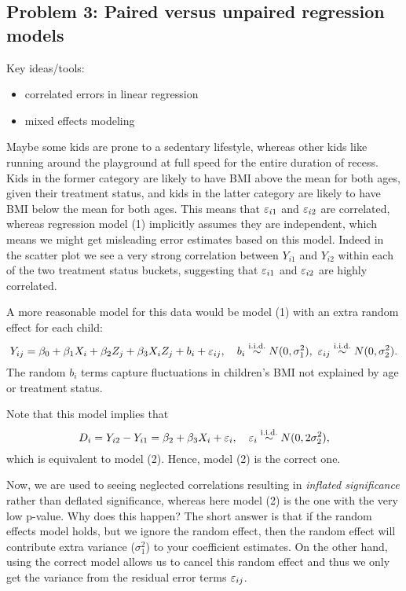 \subsection*{Problem 3: Paired versus unpaired regression models}
Key ideas/tools:
\begin{itemize}
	\item correlated errors in linear regression
	\item mixed effects modeling
\end{itemize}

Maybe some kids are prone to a sedentary lifestyle, whereas other kids like running around the playground at full speed for the entire duration of recess. Kids in the former category are likely to have BMI above the mean for both ages, given their treatment status, and kids in the latter category are likely to have BMI below the mean for both ages. This means that ${\varepsilon}_{i1}$ and ${\varepsilon}_{i2}$ are correlated, whereas regression model (1) implicitly assumes they are independent, which means we might get misleading error estimates based on this model. Indeed in the scatter plot we see a very strong correlation between $Y_{i1}$ and $Y_{i2}$ within each of the two treatment status buckets, suggesting that ${\varepsilon}_{i1}$ and ${\varepsilon}_{i2}$ are highly correlated.

A more reasonable model for this data would be model (1) with an extra random effect for each child:
\begin{equation*}
Y_{ij} = \beta_0 + \beta_1 X_i + \beta_2 Z_j + \beta_3 X_i Z_j + b_i + \eps_{ij}, \quad b_i \overset{\text{i.i.d.}}\sim N(0, \sigma_1^2), \ \eps_{ij} \overset{\text{i.i.d.}}{\sim} N(0, \sigma_2^2).
\end{equation*}
The random $b_i$ terms capture fluctuations in children's BMI not explained by age or treatment status. 

Note that this model implies that
\begin{equation*}
D_i = Y_{i2} - Y_{i1} = \beta_2 + \beta_3 X_i + {\varepsilon}_i, \quad {\varepsilon}_i \overset{\text{i.i.d.}}\sim N(0, 2\sigma_2^2),
\end{equation*}
which is equivalent to model (2). Hence, model (2) is the correct one. 

Now, we are used to seeing neglected correlations resulting in \textit{inflated significance} rather than deflated significance, whereas here model (2) is the one with the very low p-value. Why does this happen? The short answer is that if the random effects model holds, but we ignore the random effect, then the random effect will contribute extra variance ($\sigma_1^2$) to your coefficient estimates. On the other hand, using the correct model allows us to cancel this random effect and thus we only get the variance from the residual error terms ${\varepsilon}_{ij}$.


